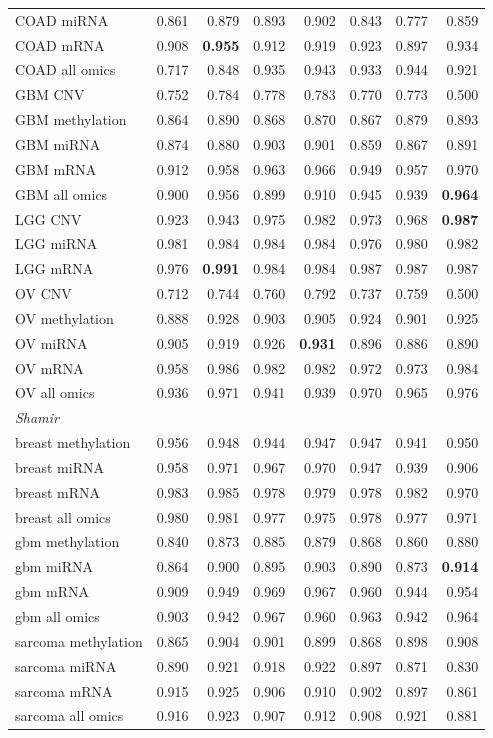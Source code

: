 \begin{tabular}{lrrrrrrr}
COAD miRNA & 0.861 & 0.879 & 0.893 & 0.902 & 0.843 & 0.777 & 0.859 \\
COAD mRNA & 0.908 & \textbf{0.955} & 0.912 & 0.919 & 0.923 & 0.897 & 0.934 \\
COAD all omics & 0.717 & 0.848 & 0.935 & 0.943 & 0.933 & 0.944 & 0.921 \\
GBM CNV & 0.752 & 0.784 & 0.778 & 0.783 & 0.770 & 0.773 & 0.500 \\
GBM methylation & 0.864 & 0.890 & 0.868 & 0.870 & 0.867 & 0.879 & 0.893 \\
GBM miRNA & 0.874 & 0.880 & 0.903 & 0.901 & 0.859 & 0.867 & 0.891 \\
GBM mRNA & 0.912 & 0.958 & 0.963 & 0.966 & 0.949 & 0.957 & 0.970 \\
GBM all omics & 0.900 & 0.956 & 0.899 & 0.910 & 0.945 & 0.939 & \textbf{0.964} \\
LGG CNV & 0.923 & 0.943 & 0.975 & 0.982 & 0.973 & 0.968 & \textbf{0.987} \\
LGG miRNA & 0.981 & 0.984 & 0.984 & 0.984 & 0.976 & 0.980 & 0.982 \\
LGG mRNA & 0.976 & \textbf{0.991} & 0.984 & 0.984 & 0.987 & 0.987 & 0.987 \\
OV CNV & 0.712 & 0.744 & 0.760 & 0.792 & 0.737 & 0.759 & 0.500 \\
OV methylation & 0.888 & 0.928 & 0.903 & 0.905 & 0.924 & 0.901 & 0.925 \\
OV miRNA & 0.905 & 0.919 & 0.926 & \textbf{0.931} & 0.896 & 0.886 & 0.890 \\
OV mRNA & 0.958 & 0.986 & 0.982 & 0.982 & 0.972 & 0.973 & 0.984 \\
OV all omics & 0.936 & 0.971 & 0.941 & 0.939 & 0.970 & 0.965 & 0.976 \\
\midrule \multicolumn{8}{l}{\emph{Shamir}} \\
breast methylation & 0.956 & 0.948 & 0.944 & 0.947 & 0.947 & 0.941 & 0.950 \\
breast miRNA & 0.958 & 0.971 & 0.967 & 0.970 & 0.947 & 0.939 & 0.906 \\
breast mRNA & 0.983 & 0.985 & 0.978 & 0.979 & 0.978 & 0.982 & 0.970 \\
breast all omics & 0.980 & 0.981 & 0.977 & 0.975 & 0.978 & 0.977 & 0.971 \\
gbm methylation & 0.840 & 0.873 & 0.885 & 0.879 & 0.868 & 0.860 & 0.880 \\
gbm miRNA & 0.864 & 0.900 & 0.895 & 0.903 & 0.890 & 0.873 & \textbf{0.914} \\
gbm mRNA & 0.909 & 0.949 & 0.969 & 0.967 & 0.960 & 0.944 & 0.954 \\
gbm all omics & 0.903 & 0.942 & 0.967 & 0.960 & 0.963 & 0.942 & 0.964 \\
sarcoma methylation & 0.865 & 0.904 & 0.901 & 0.899 & 0.868 & 0.898 & 0.908 \\
sarcoma miRNA & 0.890 & 0.921 & 0.918 & 0.922 & 0.897 & 0.871 & 0.830 \\
sarcoma mRNA & 0.915 & 0.925 & 0.906 & 0.910 & 0.902 & 0.897 & 0.861 \\
sarcoma all omics & 0.916 & 0.923 & 0.907 & 0.912 & 0.908 & 0.921 & 0.881 \\
\bottomrule
\end{tabular}
